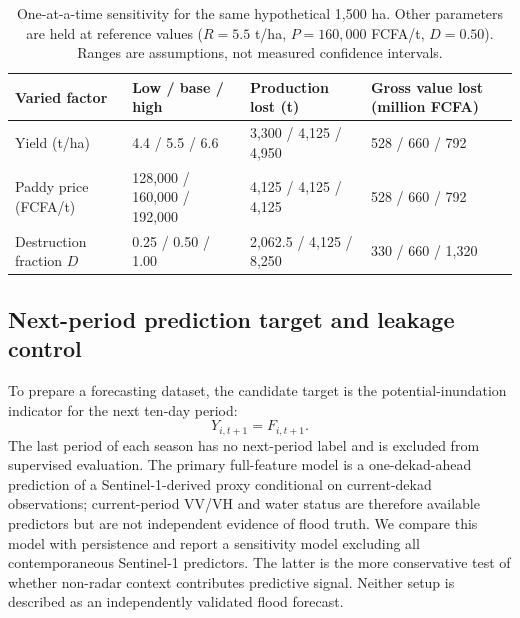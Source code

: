\documentclass[pdflatex,sn-mathphys,Numbered]{sn-jnl}
\begin{document}
\begin{table}[t]
\centering
\caption{One-at-a-time sensitivity for the same hypothetical 1,500 ha. Other parameters are held at reference values ($R=5.5$ t/ha, $P=160{,}000$ FCFA/t, $D=0.50$). Ranges are assumptions, not measured confidence intervals.}
\label{tab:rice-loss-sensitivity}
\small
\setlength{\tabcolsep}{3pt}
\begin{tabularx}{\textwidth}{@{}p{}p{}p{}X@{}}
\toprule
Varied factor & Low / base / high & Production lost (t) & Gross value lost (million FCFA) \\
\midrule
Yield (t/ha) & 4.4 / 5.5 / 6.6 & 3,300 / 4,125 / 4,950 & 528 / 660 / 792 \\
Paddy price (FCFA/t) & 128,000 / 160,000 / 192,000 & 4,125 / 4,125 / 4,125 & 528 / 660 / 792 \\
Destruction fraction $D$ & 0.25 / 0.50 / 1.00 & 2,062.5 / 4,125 / 8,250 & 330 / 660 / 1,320 \\
\bottomrule
\end{tabularx}
\end{table}

\subsection{Next-period prediction target and leakage control}
To prepare a forecasting dataset, the candidate target is the potential-inundation indicator for the next ten-day period:
\begin{equation}
Y_{i,t+1}=F_{i,t+1}.
\end{equation}
The last period of each season has no next-period label and is excluded from supervised evaluation. The primary full-feature model is a one-dekad-ahead prediction of a Sentinel-1-derived proxy conditional on current-dekad observations; current-period VV/VH and water status are therefore available predictors but are not independent evidence of flood truth. We compare this model with persistence and report a sensitivity model excluding all contemporaneous Sentinel-1 predictors. The latter is the more conservative test of whether non-radar context contributes predictive signal. Neither setup is described as an independently validated flood forecast.
\end{document}
